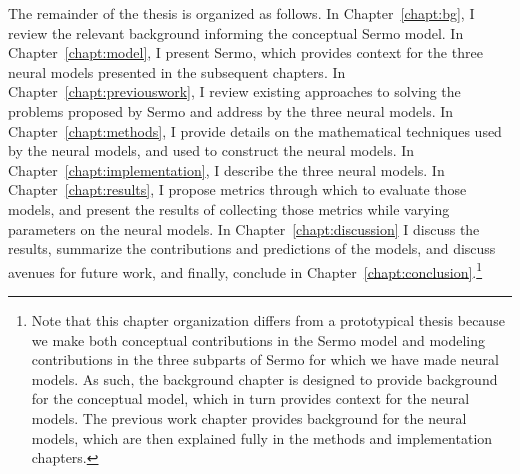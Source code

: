 The remainder of the thesis is organized as follows.
In Chapter~\ref{chapt:bg},
I review the relevant background informing
the conceptual Sermo model.
In Chapter~\ref{chapt:model},
I present Sermo,
which provides context for
the three neural models presented
in the subsequent chapters.
In Chapter~\ref{chapt:previouswork},
I review existing approaches
to solving the problems
proposed by Sermo
and address by the three neural models.
In Chapter~\ref{chapt:methods},
I provide details on the
mathematical techniques
used by the neural models,
and used to construct the neural models.
In Chapter~\ref{chapt:implementation},
I describe the three neural models.
In Chapter~\ref{chapt:results},
I propose metrics through which
to evaluate those models,
and present the results of collecting those metrics
while varying parameters on the neural models.
In Chapter~\ref{chapt:discussion}
I discuss the results,
summarize the contributions and predictions
of the models,
and discuss avenues for future work,
and finally,
conclude in Chapter~\ref{chapt:conclusion}.\footnote{
  Note that this chapter organization differs
  from a prototypical thesis
  because we make both
  conceptual contributions
  in the Sermo model
  and modeling contributions
  in the three subparts of Sermo
  for which we have made neural models.
  As such, the background chapter is designed
  to provide background for the conceptual model,
  which in turn provides context
  for the neural models.
  The previous work chapter provides
  background for the neural models,
  which are then explained fully
  in the methods and implementation chapters.}
